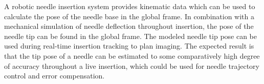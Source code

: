 A robotic needle insertion system provides kinematic data which can be used to calculate the pose of the needle base in the global frame. In combination with a mechanical simulation of needle deflection throughout insertion, the pose of the needle tip can be found in the global frame. The modeled needle tip pose can be used during real-time insertion tracking to plan imaging. The expected result is that the tip pose of a needle can be estimated to some comparatively high degree of accuracy throughout a live insertion, which could be used for needle trajectory control and error compensation.









\vspace{-2mm}




